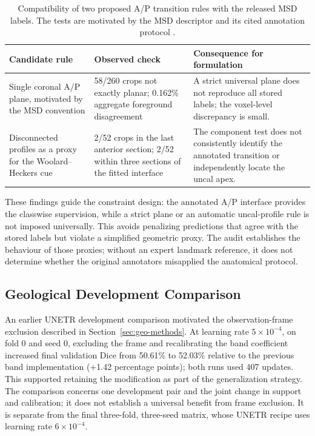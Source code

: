\documentclass[12pt,a4paper]{article}
\begin{document}
\begin{table}[htbp]
\centering\small{}
\begin{tabular}{@{}P{3.6cm}P{4.2cm}P{6.8cm}@{}}
\hline
Candidate rule & Observed check & Consequence for formulation \\
\hline
Single coronal A/P plane, motivated by the MSD convention & 58/260 crops not exactly planar; 0.162\% aggregate foreground disagreement & A strict universal plane does not reproduce all stored labels; the voxel-level discrepancy is small. \\[.6em]
Disconnected profiles as a proxy for the Woolard--Heckers cue & 2/52 crops in the last anterior section; 2/52 within three sections of the fitted interface & The component test does not consistently identify the annotated transition or independently locate the uncal apex. \\
\hline
\end{tabular}
\caption{Compatibility of two proposed A/P transition rules with the
released MSD labels. The tests are motivated by the MSD descriptor and
its cited annotation protocol \cite{simpson2019dataset,woolard2012asymmetry}.}
\label{tab:annotation-audit-results}
\end{table}

These findings guide the constraint design: the annotated A/P interface
provides the classwise supervision, while a strict plane or an automatic
uncal-profile rule is not imposed universally. This avoids penalizing
predictions that agree with the stored labels but violate a simplified
geometric proxy. The audit establishes the behaviour of those proxies;
without an expert landmark reference, it does not determine whether
the original annotators misapplied the anatomical protocol.


\FloatBarrier

\subsection{Geological Development Comparison}\label{sec:geo-development}
An earlier UNETR development comparison motivated the observation-frame
exclusion described in Section~\ref{sec:geo-methods}. At learning rate
$5\times10^{-4}$, on fold 0 and seed 0, excluding the frame and
recalibrating the band coefficient increased final validation Dice
from 50.61\% to 52.03\% relative to the previous band implementation
(+1.42 percentage points); both runs used 407 updates. This supported
retaining the modification as part of the generalization strategy.
The comparison concerns one development pair and the joint change in
support and calibration; it does not establish a universal benefit
from frame exclusion. It is separate from the final three-fold,
three-seed matrix, whose UNETR recipe uses learning rate
$6\times10^{-4}$.
\end{document}
